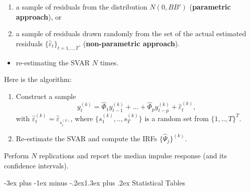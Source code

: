 \documentclass[
  11pt,
]{book}
\makeatletter
\providecommand{\tightlist}{%
  \setlength{\itemsep}{0pt}\setlength{\parskip}{0pt}}
\renewcommand\section{\@startsection{section}{1}{\z@}
  {-3ex plus -1ex minus -.2ex}{1.3ex plus .2ex}
  {\normalfont\Large\bfseries\color{TextbookInk}}}
\theoremstyle{definition}
\theoremstyle{definition}
\theoremstyle{definition}
\theoremstyle{definition}
\theoremstyle{remark}
\makeatother
\begin{document}
\begin{enumerate}
\def\labelenumi{\alph{enumi}.}
\tightlist
\item
  a sample of residuals from the distribution \(N(0,BB')\) (\textbf{parametric approach}), or
\item
  a sample of residuals drawn randomly from the set of the actual estimated residuals \(\{\hat\varepsilon_t\}_{t=1,..,T}\). (\textbf{non-parametric approach}).
\end{enumerate}

\begin{itemize}
\tightlist
\item
  re-estimating the SVAR \(N\) times.
\end{itemize}

Here is the algorithm:

\begin{enumerate}
\def\labelenumi{\arabic{enumi}.}
\tightlist
\item
  Construct a sample
  \[
  y_t^{(k)}=\widehat{\Phi}_1 y_{t-1}^{(k)} + \dots + \widehat{\Phi}_p y_{t-p}^{(k)} + \hat\varepsilon_t^{(k)},
  \]
  with \(\hat\varepsilon_{t}^{(k)}=\hat\varepsilon_{s_t^{(k)}}\), where \(\{s_1^{(k)},..,s_T^{(k)}\}\) is a random set from \(\{1,..,T\}^T\).
\item
  Re-estimate the SVAR and compute the IRFs \(\{\widehat{\Psi}_j\}^{(k)}\).
\end{enumerate}

Perform \(N\) replications and report the median impulse response (and its confidence intervals).

\section{Statistical Tables}\label{statistical-tables}
\end{document}
